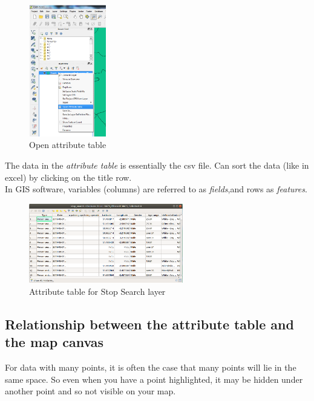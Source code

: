 \begin{figure}[!h]
	\centering
	\includegraphics[width=0.3\textwidth]{images/right_click_layername.png}
	\caption{Open attribute table}
	\label{ft_fig_firstfig3}
\end{figure}

The data in the \textit{attribute table} is essentially the csv file. Can sort the data (like in excel) by clicking on the title row.\\
In GIS software, variables (columns) are referred to as \textit{fields},and rows as \textit{features}.\\

\begin{figure}[!h]
	\centering
	\includegraphics[width=0.6\textwidth]{images/stop_search_attribute_table.png}
	\caption{Attribute table for Stop Search layer}
	\label{ft_fig_firstfig3}
\end{figure}

\null\newpage

\subsection{Relationship between the attribute table and the map canvas}
For data with many points, it is often the case that many points will lie in the same space. So even when you have a point highlighted, it may be hidden under another point and so not visible on your map.

